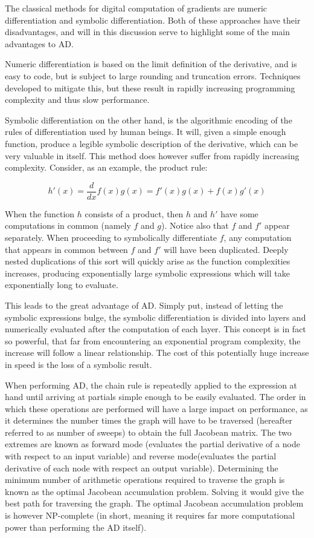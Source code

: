 \documentclass[11pt]{article}
\begin{document}
The classical methods for digital computation of gradients are numeric differentiation and symbolic differentiation. Both of these approaches have their disadvantages, and will in this discussion serve to highlight some of the main advantages to AD.

Numeric differentiation is based on the limit definition of the derivative, and is easy to code, but is subject to large rounding and truncation errors. Techniques developed to mitigate this, but these result in rapidly increasing programming complexity and thus slow performance.

Symbolic differentiation on the other hand, is the algorithmic encoding of the rules of differentiation used by human beings. It will, given a simple enough function, produce a legible symbolic description of the derivative, which can be very valuable in itself. This method does however suffer from rapidly increasing complexity. Consider, as an example, the product rule:

\[ h'(x) = \frac d{dx} f(x)g(x) = f'(x)g(x) + f(x)g'(x) \]

When the function $ h $ consists of a product, then $ h $ and $ h' $ have some computations in common (namely $ f $ and $ g $). Notice also that $ f $ and $ f' $ appear separately. When proceeding to symbolically differentiate  $ f $, any computation that appears in common between $ f $ and $ f' $ will have been duplicated. Deeply nested duplications of this sort will quickly arise as the function complexities increases, producing exponentially large symbolic expressions which will take exponentially long to evaluate. 

This leads to the great advantage of AD. Simply put, instead of letting the symbolic expressions bulge, the symbolic differentiation is divided into layers and numerically evaluated after the computation of each layer. This concept is in fact so powerful, that far from encountering an exponential program complexity, the increase will follow a linear relationship. The cost of this potentially huge increase in speed is the loss of a symbolic result. 

When performing AD, the chain rule is repeatedly applied to the expression at hand until arriving at partials simple enough to be easily evaluated. The order in which these operations are performed will have a large impact on performance, as it determines the number times the graph will have to be traversed (hereafter referred to as number of sweeps) to obtain the full Jacobean matrix. The two extremes are known as forward mode (evaluates the partial derivative of a node with respect to an input variable) and reverse mode(evaluates the partial derivative of each node with respect an output variable). Determining the minimum number of arithmetic operations required to traverse the graph is known as the optimal Jacobean accumulation problem. Solving it would give the best path for traversing the graph. The optimal Jacobean accumulation problem is however NP-complete (in short, meaning it requires far more computational power than performing the AD itself).
\end{document}

